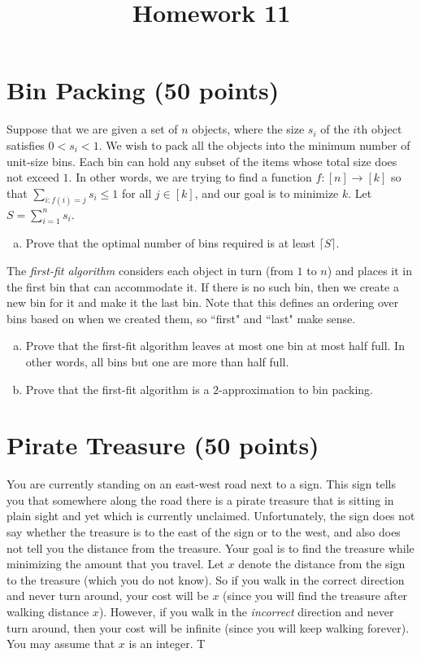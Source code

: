 \documentclass{article}
\begin{document}
\title{Homework 11}
\maketitle
\thispagestyle{fancy}

\section{Bin Packing (50 points)}
Suppose that we are given a set of $n$ objects, where the size $s_i$ of the $i$th object satisfies $0 < s_i < 1$.  We wish to pack all the objects into the minimum number of unit-size bins.  Each bin can hold any subset of the items whose total size does not exceed $1$.  In other words, we are trying to find a function $f : [n] \rightarrow [k]$ so that $\sum_{i : f(i) = j} s_i \leq 1$ for all $j \in [k]$, and our goal is to minimize $k$.  Let $S = \sum_{i=1}^n s_i$.

\begin{enumerate}[(a)]
	\item Prove that the optimal number of bins required is at least $\lceil S \rceil$.  

\end{enumerate}

The \emph{first-fit algorithm} considers each object in turn (from $1$ to $n$) and places it in the first bin that can accommodate it.  If there is no such bin, then we create a new bin for it and make it the last bin.  Note that this defines an ordering over bins based on when we created them, so ``first" and ``last" make sense.

\begin{enumerate}[(a), resume]
	\item Prove that the first-fit algorithm leaves at most one bin at most half full.  In other words, all bins but one are more than half full.

	\item Prove that the first-fit algorithm is a $2$-approximation to bin packing.

\end{enumerate}


\section{Pirate Treasure (50 points)}
You are currently standing on an east-west road next to a sign.  This sign tells you that somewhere along the road there is a pirate treasure that is sitting in plain sight and yet which is currently unclaimed.  Unfortunately, the sign does not say whether the treasure is to the east of the sign or to the west, and also does not tell you the distance from the treasure.  Your goal is to find the treasure while minimizing the amount that you travel.  Let $x$ denote the distance from the sign to the treasure (which you do not know).  So if you walk in the correct direction and never turn around, your cost will be $x$ (since you will find the treasure after walking distance $x$).  However, if you walk in the \emph{incorrect} direction and never turn around, then your cost will be infinite (since you will keep walking forever).  You may assume that $x$ is an integer.  T
\end{document}
